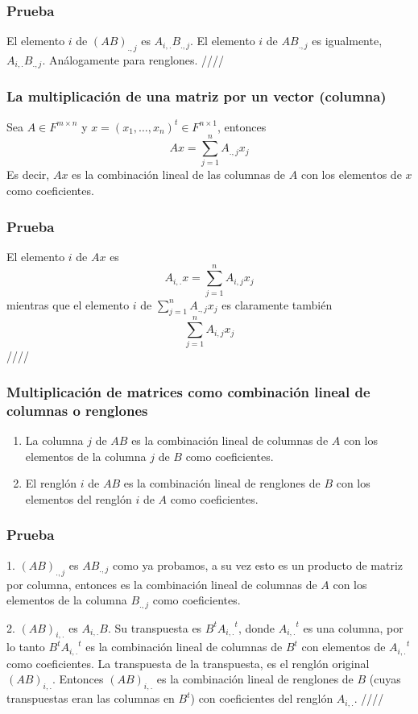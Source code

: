 \documentclass{article}
\begin{document}
\subsubsection*{Prueba}
El elemento $i$ de $(AB)_{.,j}$ es $A_{i,.} B_{.,j}$.
El elemento $i$ de $AB_{.,j}$ es igualmente, $A_{i,.}B_{.,j}$.
Análogamente para renglones. \hfill ////

\subsubsection{La multiplicación de una matriz por un vector (columna)}
Sea $A\in F^{m\times n}$ y $x=(x_1,\ldots,x_n)^t\in F^{n\times 1}$,
entonces
$$Ax=\sum^n_{j=1}A_{.,j} x_j$$
Es decir, $Ax$ es la combinación lineal de las columnas de $A$
con los elementos de $x$ como coeficientes.
\subsubsection*{Prueba}
El elemento $i$ de $Ax$ es
$$A_{i,.}x=\sum^n_{j=1}A_{i,j}x_j$$
mientras que el elemento $i$ de $\sum^n_{j=1}A_{.,j} x_j$
es claramente también
$$\sum^n_{j=1}A_{i,j} x_j$$
\hfill ////

\subsubsection{Multiplicación de matrices como combinación lineal
de columnas o renglones}
\begin{enumerate}
    \item La columna $j$ de $AB$ es la combinación lineal de columnas
    de $A$ con los elementos de la columna $j$ de $B$ como coeficientes.
    \item El renglón $i$ de $AB$ es la combinación lineal de renglones
    de $B$ con los elementos del renglón $i$ de $A$ como coeficientes.
\end{enumerate}
\subsubsection*{Prueba}
1. $(AB)_{.,j}$ es $AB_{.,j}$ como ya probamos, a su vez esto
es un producto de matriz por columna, entonces es la combinación lineal
de columnas de $A$ con los elementos de la columna $B_{.,j}$ como
coeficientes.

2. $(AB)_{i,.}$ es $A_{i,.}B$. Su transpuesta es $B^t{A_{i,.}}^t$, donde
${A_{i,.}}^t$ es una columna, por lo tanto $B^t{A_{i,.}}^t$ es la combinación lineal de columnas de $B^t$ con
elementos de ${A_{i,.}}^t$ como coeficientes. La transpuesta de la
transpuesta, es el renglón original $(AB)_{i,.}$. Entonces
$(AB)_{i,.}$ es la combinación lineal de renglones de $B$ (cuyas transpuestas eran las columnas en $B^t$) con coeficientes del renglón $A_{i,.}$.
\hfill ////
\end{document}
